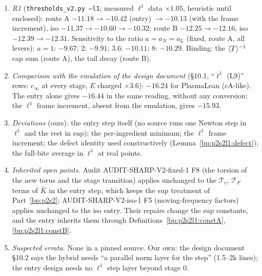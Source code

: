 \begin{remark}[Register]
\begin{enumerate}[label=(\roman*)]
\item \emph{R1} (\texttt{thresholds\_v2.py --l1}; measured $\ell^1$ data $\times1.05$, heuristic until enclosed): route A $-11.18\to-10.42$ (entry)
  $\to-10.13$ (with the frame increment), iso $-11.37\to-10.60\to-10.32$; route B $-12.25\to-12.16$, iso $-12.39\to-12.31$. Sensitivity to the
  ratio $a=a_N=a_L$ (fixed, route A, all levers): $a=1$: $-9.67$; $2$: $-9.91$; $3.6$: $-10.11$; $8$: $-10.29$. Binding: the $\langle T\rangle^{-1}$ cap sum
  (route A), the tail decay (route B).
\item \emph{Comparison with the emulation of the design document} (\S10.1, ``$\ell^1$ (L9)'' rows: $c_\infty$ at every stage, $E$ charged $\times3.6$): $-16.24$
  for PlasmaLean (cA-like). The entry alone gives $-16.44$ in the same reading, without any conversion; the $\ell^1$ frame increment, absent from the
  emulation, gives $-15.93$.
\item \emph{Deviations} (ours): the entry step itself (no source runs one Newton step in $\ell^1$ and the rest in sup); the per-ingredient minimum; the
  $\ell^1$ frame increment; the defect identity used constructively (Lemma~\ref{bp:p2s2l1:defect}); the full-bite average in $\ell^1$ at real points.
\item \emph{Inherited open points.} Audit AUDIT-SHARP-V2-fixed-1 F8 (the torsion of the new torus and the stage transition) applies unchanged to the
  $\mathcal T_c$, $\mathcal T_F$ terms of $\bar K$ in the entry step, which keeps the sup treatment of Part~\ref{bp:p2s2}; AUDIT-SHARP-V2-iso-1 F5 (moving-frequency
  factors) applies unchanged to the iso entry. Their repairs change the sup constants, and the entry inherits them through Definitions~\ref{bp:p2s2l1:constA},
  \ref{bp:p2s2l1:constB}.
\item \emph{Suspected errata.} None in a pinned source. Our own: the design document \S10.2 says the hybrid needs ``a parallel norm layer for the step''
  (1.5--2k lines); the entry design needs no $\ell^1$ step layer beyond stage $0$.
\end{enumerate}
\end{remark}
